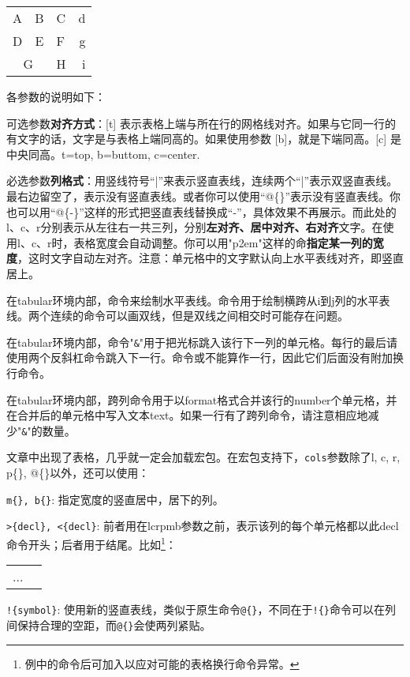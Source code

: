 \begin{codeshow}
\begin{center}
  \begin{tabular}[c]{|l|c||p{3em}
    r@{-}} \hline\hline
    A & B & C & d\\D & E & F & g\\
    \cline{1-2}
    \multicolumn{2}{|c|}{G}&H&i\\
    \hline
  \end{tabular}
\end{center}
\end{codeshow}

各参数的说明如下：
\begin{feai}
\item 可选参数\textbf{对齐方式}：[t] 表示表格上端与所在行的网格线对齐。如果与它同一行的有文字的话，文字是与表格上端同高的。如果使用参数 [b]，就是下端同高。[c] 是中央同高。t=top, b=buttom, c=center.
\item 必选参数\textbf{列格式}：用竖线符号“|”来表示竖直表线，连续两个“|”表示双竖直表线。最右边留空了，表示没有竖直表线。或者你可以使用“@\{\}”表示没有竖直表线。你也可以用“@\{-\}”这样的形式把竖直表线替换成“-”，具体效果不再展示。而此处的l、c、r分别表示从左往右一共三列，分别\textbf{左对齐、居中对齐、右对齐}文字。在使用l、c、r时，表格宽度会自动调整。你可以用"p{2em}"这样的命\textbf{指定某一列的宽度}，这时文字自动左对齐。注意：单元格中的文字默认向上水平表线对齐，即竖直居上。
\item 在tabular环境内部，命令来绘制水平表线。命令用于绘制横跨从i到j列的水平表线。两个连续的命令可以画双线，但是双线之间相交时可能存在问题。
\item 在tabular环境内部，命令"\texttt{\&}"用于把光标跳入该行下一列的单元格。每行的最后请使用两个反斜杠命令跳入下一行。命令或不能算作一行，因此它们后面没有附加换行命令。
\item 在tabular环境内部，跨列命令用于以format格式合并该行的number个单元格，并在合并后的单元格中写入文本text。如果一行有了跨列命令，请注意相应地减少"\texttt{\&}"的数量。
\end{feai}

文章中出现了表格，几乎就一定会加载宏包。在宏包支持下，\texttt{cols}参数除了l, c, r, p\{\}, @\{\}以外，还可以使用：
\begin{feai}
\item \texttt{m\{\}, b\{\}}: 指定宽度的竖直居中，居下的列。
\item \verb|>{decl}, <{decl}|: 前者用在lcrpmb参数之前，表示该列的每个单元格都以此decl命令开头；后者用于结尾。比如\footnote{例中的命令后可加入以应对可能的表格换行命令异常。}：
\begin{latex}
\begin{tabular}{|>{\centering\ttfamily}p{5em}
    |>{$}c<{$}|}
...
\end{tabular}
\end{latex}
\item \verb|!{symbol}|:  使用新的竖直表线，类似于原生命令\texttt{@\{\}}，不同在于\verb|!{}|命令可以在列间保持合理的空距，而\verb|@{}|会使两列紧贴。
\end{feai}

